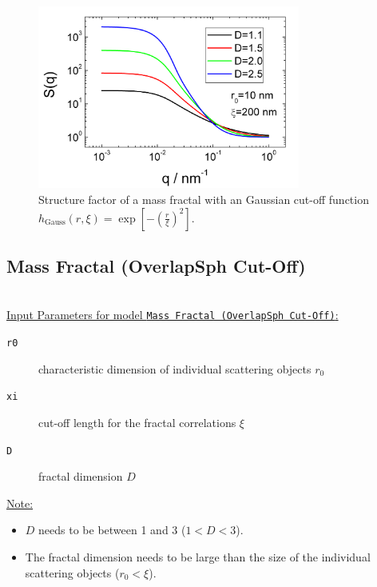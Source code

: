 \begin{figure}[htb]
\begin{center}
\includegraphics[width=0.768\textwidth]{../images/structure_factor/MassFractals/SQGaussCutOff.png}
\end{center}
\caption{Structure factor of a mass fractal with an Gaussian
cut-off function $h_\text{Gauss}(r,\xi) = \exp\left[-\left(\tfrac{r}{\xi}\right)^2\right]$.}
\label{fig:SQGaussCutOff}
\end{figure}


\clearpage
\subsection{Mass Fractal (OverlapSph Cut-Off)}
~\\

\underline{Input Parameters for model \texttt{Mass Fractal (OverlapSph Cut-Off)}:}
\begin{description}
\item[\texttt{r0}] characteristic dimension of individual scattering objects $r_0$
\item[\texttt{xi}] cut-off length for the fractal correlations $\xi$
\item[\texttt{D}] fractal dimension $D$
\end{description}

\underline{Note:}
\begin{itemize}
\item $D$ needs to be between 1 and 3 ($1<D<3$).
\item The fractal dimension needs to be large than the size of the individual scattering objects ($r_0 < \xi$).
\end{itemize}


